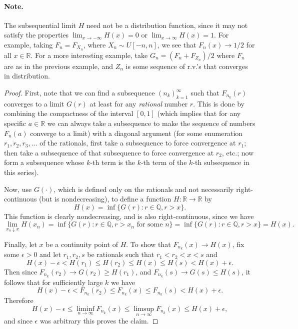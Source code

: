 \documentclass[12pt]{article}
\newcommand{\R}{\mathbb{R}}
\theoremstyle{example}
\begin{document}
\paragraph{Note.} The subsequential limit $H$ need not be a distribution function, since it may not satisfy the properties $\lim_{x\to-\infty} H(x) = 0$ or $\lim_{x\to\infty} H(x)=1$. For example, taking $F_n = F_{X_n}$, where $X_n \sim U[-n,n]$, we see that $F_n(x)\to 1/2$ for all $x\in\R$. For a more interesting example, take $G_n = (F_n + F_{Z_n})/2$ where $F_n$ are as in the previous example, and $Z_n$ is some sequence of r.v.'s that converges in distribution.

\begin{proof}
First, note that we can find a subsequence $(n_k)_{k=1}^\infty$ such that $F_{n_k}(r)$ converges to a limit $G(r)$ at least for any \emph{rational} number $r$. This is done by combining the compactness of the interval $[0,1]$ (which implies that for any specific $a\in\R$ we can always take a subsequence to make the sequence of numbers $F_n(a)$ converge to a limit) with a diagonal argument (for some enumeration $r_1, r_2, r_3, \ldots$ of the rationals, first take a subsequence to force convergence at $r_1$; then take a subsequence of that subsequence to force convergence at $r_2$, etc.; now form a subsequence whose $k$-th term is the $k$-th term of the $k$-th subsequence in this series).

Now, use $G(\cdot)$, which is defined only on the rationals and not necessarily right-continuous (but is nondecreasing), to define a function $H:\R \to \R$ by
$$ H(x) = \inf\{ G(r) : r\in\mathbb{Q}, r>x \}. $$
This function is clearly nondecreasing, and is also right-continuous, since we have
$$ \lim_{x_n \downarrow x} H(x_n) = \inf\{ G(r) : r\in\mathbb{Q}, r>x_n\textrm{ for some }n \}
= \inf\{ G(r) : r\in\mathbb{Q}, r>x \} = H(x). $$

Finally, let $x$ be a continuity point of $H$. To show that $F_{n_k}(x)\to H(x)$, fix some $\epsilon>0$ and let $r_1,r_2,s$ be rationals such that $r_1 < r_2 < x < s$ and
$$ H(x)-\epsilon < H(r_1) \le H(r_2) \le H(x) \le H(s) < H(x)+\epsilon. $$
Then since $F_{n_k}(r_2)\to G(r_2)\ge H(r_1)$, and $F_{n_k}(s)\to G(s)\le H(s)$, it follows that for sufficiently large $k$ we have
$$ H(x)-\epsilon < F_{n_k}(r_2) \le F_{n_k}(x) \le F_{n_k}(s) < H(x)+\epsilon. $$
Therefore $$ H(x)-\epsilon \le \liminf_{n\to\infty} F_{n_k}(x) \le \limsup_{n\to\infty} F_{n_k}(x) \le H(x)+\epsilon, $$
and since $\epsilon$ was arbitrary this proves the claim.
\end{proof}
\end{document}
